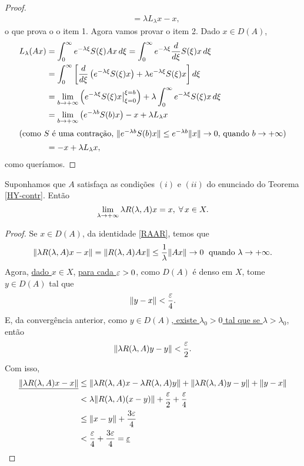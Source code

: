 \begin{proof}
\begin{align*}
& =\lambda
L_\lambda x-x,
\end{align*}
o que prova o o item 1. Agora vamos provar o item 2. Dado $x\in D(A)$, 
\begin{align*}
L_\lambda(Ax)& =\int_0^{\infty}e^{-\lambda
 \xi}S(\xi)Ax\,d\xi=\int_0^{\infty}e^{-\lambda
 \xi}\frac{d}{d\xi}S(\xi)x\,d\xi\\
& =\int_0^{\infty} \bigg[ \frac{d}{d\xi}\left(e^{-\lambda
 \xi}S(\xi)x\right)+\lambda e^{-\lambda
 \xi}S(\xi)x \bigg]\,d\xi\\
& =\lim_{b\to +\infty}\left(e^{-\lambda
 \xi}S(\xi)x\big\vert_{\xi=0}^{\xi=b}\right)+\lambda \int_0^{\infty}e^{-\lambda
 \xi}S(\xi)x \,d\xi\\
& =\lim_{b\to +\infty}\left(e^{-\lambda
 b}S(b)x\right)-x+\lambda L_\lambda x\\
\shortintertext{(como $S$ é uma contração, $\|e^{-\lambda b}S(b)x\|\leq e^{-\lambda b}\|x\|\to 0$, quando $b\to +\infty$)}
& =-x+\lambda L_\lambda x,
\end{align*}
como queríamos.
\end{proof}

\begin{lemma}\label{ap} Suponhamos que $A$ satisfaça as condições $(i)$ e $(ii)$ do enunciado do Teorema \ref{HY-contr}. Então
\begin{equation*}
\lim_{\lambda \to +\infty} \lambda R(\lambda,A) x=x, \; \forall\,x\in X.
\end{equation*}
\end{lemma}
\begin{proof}
Se $x\in D(A)$, da identidade \eqref{RAAR}, temos que
\begin{equation*}
\|\lambda R(\lambda,A) x-x\|=\|R(\lambda,A) Ax\|\leq \frac{1}{\lambda}\|Ax\|\to 0\; 
\text{ quando } \lambda\to +\infty.
\end{equation*}
Agora, \underline{dado $x\in X$}, \underline{para cada $\varepsilon>0$}, como $D(A)$ é denso em $X$, tome $y\in D(A)$ tal que
\[\|y-x\|< \frac{\varepsilon}{4}.\]
E, da convergência anterior, como $y\in D(A)$,\underline{ existe $\lambda_0>0$ tal que se
$\lambda >\lambda_0$}, então
\begin{equation*}
\|\lambda R(\lambda,A) y-y\|< \frac{\varepsilon}{2}.
\end{equation*}
Com isso, 
\begin{align*}
\underline{\|\lambda R(\lambda,A) x-x\|}& \leq \|\lambda R(\lambda,A) x-\lambda R(\lambda,A) y\|
+\|\lambda R(\lambda,A) y-y\|+\|y-x\|\\
& < \lambda \|R(\lambda,A) (x-y)\|+ \frac{\varepsilon}{2}+\frac{\varepsilon}{4}\\
& \leq \|x-y\|+ \frac{3\varepsilon}{4}\\
&< \frac{\varepsilon}{4}+\frac{3\varepsilon}{4}=\underline{\varepsilon}\\
\end{align*}
\end{proof}

